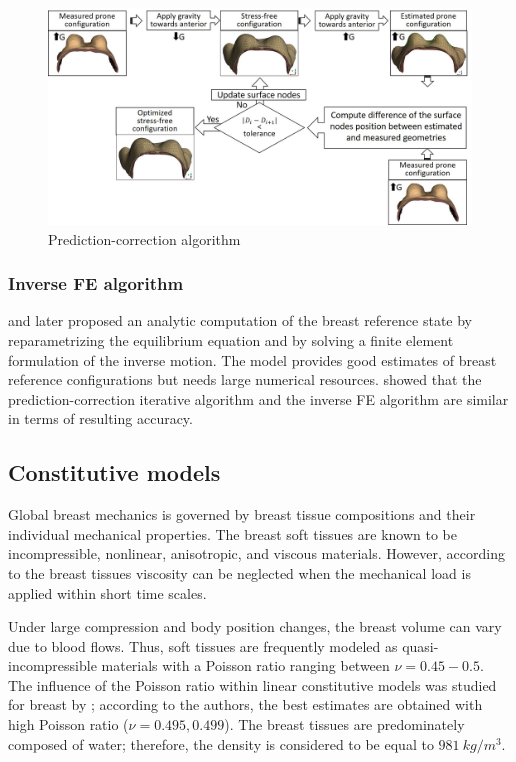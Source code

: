\begin{figure}[!h]
\centering
\includegraphics[width=1\textwidth,keepaspectratio]{figures/prediction-correction.jpg} 
\caption{Prediction-correction algorithm}\label{predictioncorectionalgo}
\end{figure}


 \subsubsection*{Inverse FE algorithm}
\cite{pathmanathan_predicting_2008} and later \cite{vavourakis_inverse_2016} proposed an analytic computation of the breast reference state by reparametrizing the equilibrium equation and by solving a finite element formulation of the inverse motion. The model provides good estimates of breast reference configurations but needs large numerical resources. \cite{eiben_breast_2014} showed that the prediction-correction iterative algorithm and the inverse FE algorithm are similar in terms of resulting accuracy. 

\subsection{Constitutive models}

Global breast mechanics is governed by breast tissue compositions and their individual mechanical properties. The breast soft tissues are known to be incompressible, nonlinear, anisotropic, and viscous materials. However, according to \cite{wellman_breast_1999} the breast tissues viscosity can be neglected when the mechanical load is applied within short time scales.  

Under large compression and body position changes, the breast volume can vary due to blood flows. Thus, soft tissues are frequently modeled as quasi-incompressible materials with a Poisson ratio ranging between $\nu = {0.45-0.5}$. The influence of the Poisson ratio within linear constitutive models was studied for breast by \cite{tanner_factors_2006}; according to the authors, the best estimates are obtained with high Poisson ratio ($\nu = {0.495,0.499}$). The breast tissues are predominately composed of water; therefore, the density is considered to be equal to $981\ kg/m^3$.  


